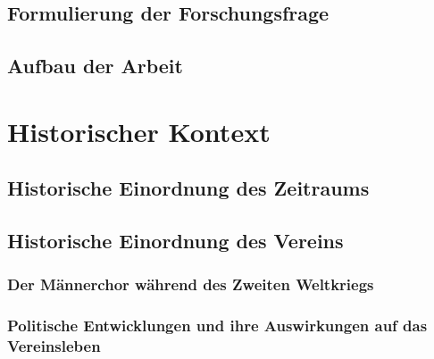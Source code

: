 \documentclass[12pt, a4paper, ngerman, bidi=default]{article}
\begin{document}
\subsection{Formulierung der Forschungsfrage}
\subsection{Aufbau der Arbeit}

\newpage
\section{Historischer Kontext}
\subsection{Historische Einordnung des Zeitraums}
\subsection{Historische Einordnung des Vereins}
  \subsubsection{Der Männerchor während des Zweiten Weltkriegs}
  \subsubsection{Politische Entwicklungen und ihre Auswirkungen auf das Vereinsleben}

  \newpage
\end{document}
